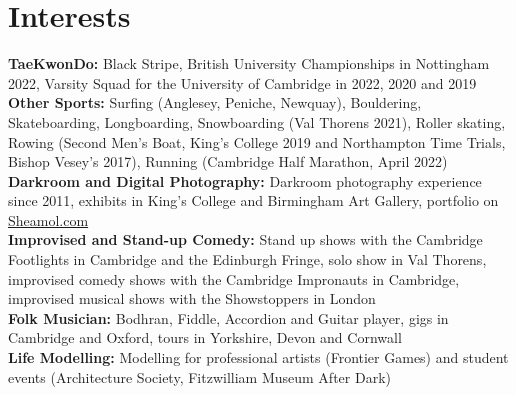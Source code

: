 \documentclass{article}
\begin{document}
\section*{Interests}
\textbf{TaeKwonDo:} Black Stripe, British University Championships in Nottingham 2022, Varsity Squad for the University of Cambridge in 2022, 2020 and 2019\\
\textbf{Other Sports:} Surfing (Anglesey, Peniche, Newquay), Bouldering, Skateboarding, Longboarding, Snowboarding (Val Thorens 2021), Roller skating, Rowing (Second Men's Boat, King's College 2019 and Northampton Time Trials, Bishop Vesey's 2017), Running (Cambridge Half Marathon, April 2022)\\
\textbf{Darkroom and Digital Photography:} Darkroom photography experience since 2011,  exhibits in King's College and Birmingham Art Gallery, portfolio on \href{www.sheamol.com}{Sheamol.com}\\
\textbf{Improvised and Stand-up Comedy:} Stand up shows with the Cambridge Footlights in Cambridge and the Edinburgh Fringe, solo show in Val Thorens, improvised comedy shows with the Cambridge Impronauts in Cambridge, improvised musical shows with the Showstoppers in London \\
\textbf{Folk Musician:} Bodhran, Fiddle, Accordion and Guitar player, gigs in Cambridge and Oxford, tours in Yorkshire, Devon and Cornwall \\
\textbf{Life Modelling:} Modelling for professional artists (Frontier Games) and student events (Architecture Society, Fitzwilliam Museum After Dark) \medskip

\vspace{-.5\baselineskip}
\hrulefill
\vspace{-.5\baselineskip}
\end{document}

